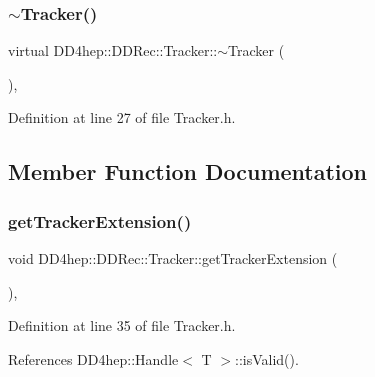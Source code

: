 \hypertarget{class_d_d4hep_1_1_d_d_rec_1_1_tracker_a8ac29fb4a453989eebf2201e6a2fca9f}{}\label{class_d_d4hep_1_1_d_d_rec_1_1_tracker_a8ac29fb4a453989eebf2201e6a2fca9f} 
\subsubsection{\texorpdfstring{$\sim$\+Tracker()}{~Tracker()}}
{\footnotesize\ttfamily virtual D\+D4hep\+::\+D\+D\+Rec\+::\+Tracker\+::$\sim$\+Tracker (\begin{DoxyParamCaption}{ }\end{DoxyParamCaption})\hspace{0.3cm}{\ttfamily [inline]}, {\ttfamily [virtual]}}



Definition at line 27 of file Tracker.\+h.



\subsection{Member Function Documentation}
\hypertarget{class_d_d4hep_1_1_d_d_rec_1_1_tracker_aff21170847730cec8db36f09873ef52c}{}\label{class_d_d4hep_1_1_d_d_rec_1_1_tracker_aff21170847730cec8db36f09873ef52c} 
\subsubsection{\texorpdfstring{get\+Tracker\+Extension()}{getTrackerExtension()}}
{\footnotesize\ttfamily void D\+D4hep\+::\+D\+D\+Rec\+::\+Tracker\+::get\+Tracker\+Extension (\begin{DoxyParamCaption}{ }\end{DoxyParamCaption})\hspace{0.3cm}{\ttfamily [inline]}, {\ttfamily [private]}}



Definition at line 35 of file Tracker.\+h.



References D\+D4hep\+::\+Handle$<$ T $>$\+::is\+Valid().



